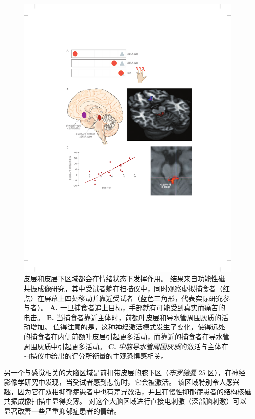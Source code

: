 \begin{figure}[htbp]
	\centering
	\includegraphics[width=0.95\linewidth]{chap42/fig_42_8}
	\caption{皮层和皮层下区域都会在情绪状态下发挥作用。
		结果来自功能性磁共振成像研究，其中受试者躺在扫描仪中，同时观察虚拟捕食者（红点）在屏幕上四处移动并靠近受试者（蓝色三角形，代表实际研究参与者）。
		\textbf{A.} 一旦捕食者追上目标，手部就有可能受到真实而痛苦的电击。
		\textbf{B.} 当捕食者靠近主体时，前额叶皮层和导水管周围灰质的活动增加。
		值得注意的是，这种神经激活模式发生了变化，使得远处的捕食者在内侧前额叶皮层引起更多活动，而靠近的捕食者在导水管周围灰质中引起更多活动。
		\textbf{C.} \textit{中脑导水管周围灰质}的激活与主体在扫描仪中给出的评分所衡量的主观恐惧感相关。}
	\label{fig:42_8}
\end{figure}


另一个与感觉相关的大脑区域是前扣带皮层的膝下区（\textit{布罗德曼} 25 区），在神经影像学研究中发现，当受试者感到悲伤时，它会被激活。
该区域特别令人感兴趣，因为它在双相抑郁症患者中也有差异激活，并且在慢性抑郁症患者的结构核磁共振成像扫描中显得变薄。
对这个大脑区域进行直接电刺激（深部脑刺激）可以显著改善一些严重抑郁症患者的情绪。



